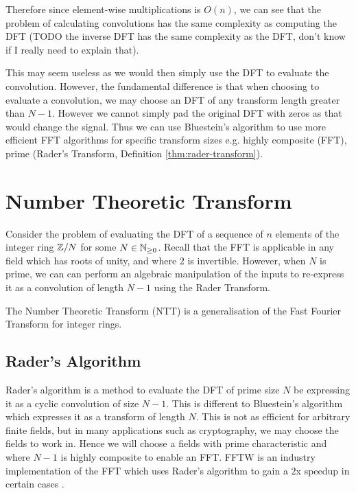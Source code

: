 Therefore since element-wise multiplications is $O(n)$, we can see that the problem of calculating convolutions has the same complexity as computing the DFT (TODO the inverse DFT has the same complexity as the DFT, don't know if I really need to explain that).

This may seem useless as we would then simply use the DFT to evaluate the convolution. However, the fundamental difference is that when choosing to evaluate a convolution, we may choose an DFT of any transform length greater than $N - 1$. However we cannot simply pad the original DFT with zeros as that would change the signal. Thus we can use Bluestein's algorithm\cite{bluestein} to use more efficient FFT algorithms for specific transform sizes e.g. highly composite (FFT), prime (Rader's Transform, Definition \ref{thm:rader-transform}).

\section{Number Theoretic Transform}
\label{sec:ntt}


Consider the problem of evaluating the DFT of a sequence of $n$ elements of the integer ring ${\mathbb Z}/N$ for some $N \in {\mathbb N}_{\ge 0}$. Recall that the FFT is applicable in any field which has roots of unity, and where $2$ is invertible. However, when $N$ is prime, we can can perform an algebraic manipulation of the inputs to re-express it as a convolution of length $N-1$ using the Rader Transform.

The Number Theoretic Transform (NTT) is a generalisation of the Fast Fourier Transform for integer rings.

\subsection{Rader's Algorithm}
\label{subsec:rt}

Rader's algorithm is a method to evaluate the DFT of prime size $N$ be expressing it as a cyclic convolution of size $N - 1$. This is different to Bluestein's algorithm which expresses it as a transform of length $N$. This is not as efficient for arbitrary finite fields, but in many applications such as cryptography, we may choose the fields to work in. Hence we will choose a fields with prime characteristic and where $N - 1$ is highly composite to enable an FFT. FFTW is an industry implementation of the FFT which uses Rader's algorithm to gain a $2$x speedup in certain cases \cite{fftw}.

